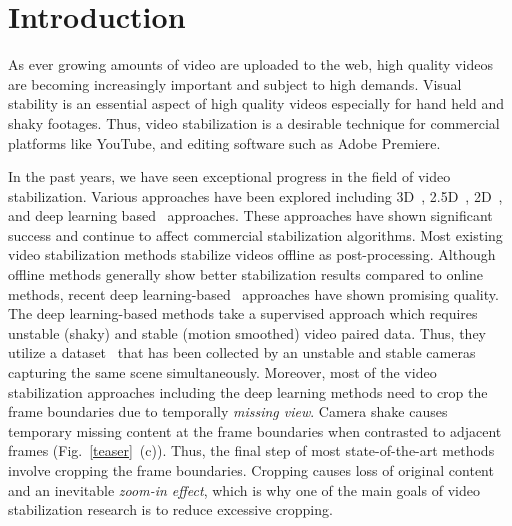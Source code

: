 \section{Introduction}

As ever growing amounts of video are uploaded to the web, high quality videos are becoming increasingly important and subject to high demands.
Visual stability is an essential aspect of high quality videos especially for hand held and shaky footages.
Thus, video stabilization is a desirable technique for commercial platforms like YouTube, and editing software such as Adobe Premiere.

In the past years, we have seen exceptional progress in the field of video stabilization.
Various approaches have been explored including 3D~\cite{liu2009content,liu2012video,zhou2013plane}, 2.5D~\cite{liu2011subspace,liu2013joint,goldstein2012video}, 2D~\cite{liu2014steadyflow,liu2016meshflow,liu2013bundled}, and deep learning based~\cite{wang2018deep,xu2018deep} approaches.
These approaches have shown significant success and continue to affect commercial stabilization algorithms.
Most existing video stabilization methods stabilize videos offline as post-processing.
Although offline methods generally show better stabilization results compared to online methods, recent deep learning-based~\cite{wang2018deep,xu2018deep} approaches have shown promising quality.
The deep learning-based methods take a supervised approach which requires unstable (shaky) and stable (motion smoothed) video paired data.
Thus, they utilize a dataset~\cite{wang2018deep} that has been collected by an unstable and stable cameras capturing the same scene simultaneously.
Moreover, most of the video stabilization approaches including the deep learning methods need to crop the frame boundaries due to temporally \emph{missing view}.
Camera shake causes temporary missing content at the frame boundaries when contrasted to adjacent frames (Fig.~\ref{teaser}~(c)).
Thus, the final step of most state-of-the-art methods involve cropping the frame boundaries.
Cropping causes loss of original content and an inevitable \emph{zoom-in effect}, which is why one of the main goals of video stabilization research is to reduce excessive cropping.

